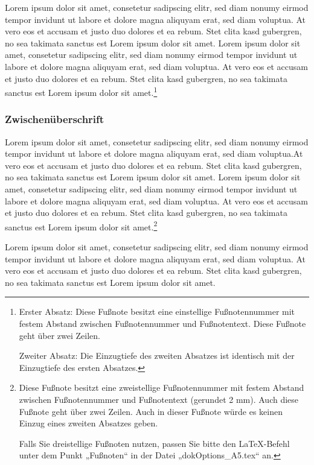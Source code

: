 Lorem ipsum dolor sit amet, consetetur sadipscing elitr, sed diam nonumy eirmod tempor invidunt ut labore et dolore magna aliquyam erat, sed diam voluptua. At vero eos et accusam et justo duo dolores et ea rebum. Stet clita kasd gubergren, no sea takimata sanctus est Lorem ipsum dolor sit amet. Lorem ipsum dolor sit amet, consetetur sadipscing elitr, sed diam nonumy eirmod tempor invidunt ut labore et dolore magna aliquyam erat, sed diam voluptua. At vero eos et accusam et justo duo dolores et ea rebum. Stet clita kasd gubergren, no sea takimata sanctus est Lorem ipsum dolor sit amet.\footnote{
	Erster Absatz: Diese Fußnote besitzt eine einstellige Fußnotennummer mit festem Abstand zwischen Fußnotennummer und Fußnotentext. Diese Fußnote geht über zwei Zeilen.
	
	Zweiter Absatz: Die Einzugtiefe des zweiten Absatzes ist identisch mit der Einzugtiefe des ersten Absatzes.
} %

\subsubsection*{Zwischenüberschrift}
\label{sssec:Zwischenüberschrift}
Lorem ipsum dolor sit amet, consetetur sadipscing elitr, sed diam nonumy eirmod tempor invidunt ut labore et dolore magna aliquyam erat, sed diam voluptua.At vero eos et accusam et justo duo dolores et ea rebum. Stet clita kasd gubergren, no sea takimata sanctus est Lorem ipsum dolor sit amet. Lorem ipsum dolor sit amet, consetetur sadipscing elitr, sed diam nonumy eirmod tempor invidunt ut labore et dolore magna aliquyam erat, sed diam voluptua. At vero eos et accusam et justo duo dolores et ea rebum. Stet clita kasd gubergren, no sea takimata sanctus est Lorem ipsum dolor sit amet.\footnote[13]{
	Diese Fußnote besitzt eine zweistellige Fußnotennummer mit festem Abstand zwischen Fußnotennummer und Fußnotentext (gerundet 2 mm). Auch diese Fußnote geht über zwei Zeilen. Auch in dieser Fußnote würde es keinen Einzug eines zweiten Absatzes geben. 
	
	Falls Sie dreistellige Fußnoten nutzen, passen Sie bitte den LaTeX-Befehl unter dem Punkt „Fußnoten“ in der Datei „dokOptions\_A5.tex“ an.
} %

Lorem ipsum dolor sit amet, consetetur sadipscing elitr, sed diam nonumy eirmod tempor invidunt ut labore et dolore magna aliquyam erat, sed diam voluptua. At vero eos et accusam et justo duo dolores et ea rebum. Stet clita kasd gubergren, no sea takimata sanctus est Lorem ipsum dolor sit amet.

